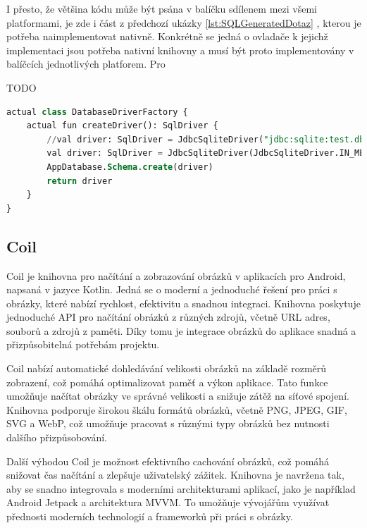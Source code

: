 I přesto, že většina kódu může být psána v balíčku sdílenem mezi všemi platformami, je zde i část z předchozí ukázky \ref{lst:SQLGeneratedDotaz}
, kterou je potřeba naimplementovat nativně. Konkrétně se jedná o ovladače k jejichž implementaci jsou potřeba nativní knihovny a musí
být proto implementovány v balíčcích jednotlivých platforem. Pro 

TODO
\begin{lstlisting}[caption={SQL vygenerovaný dotaz}, label={lst:SQLGeneratedDotaz}, language=SQL]
  actual class DatabaseDriverFactory {
    actual fun createDriver(): SqlDriver {
        //val driver: SqlDriver = JdbcSqliteDriver("jdbc:sqlite:test.db")
        val driver: SqlDriver = JdbcSqliteDriver(JdbcSqliteDriver.IN_MEMORY)
        AppDatabase.Schema.create(driver)
        return driver
    }
}
\end{lstlisting}




\subsection{Coil}
Coil je knihovna pro načítání a zobrazování obrázků v aplikacích pro Android, napsaná v jazyce Kotlin. Jedná se o moderní a jednoduché 
řešení pro práci s obrázky, které nabízí rychlost, efektivitu a snadnou integraci. Knihovna poskytuje jednoduché API pro načítání obrázků 
z různých zdrojů, včetně URL adres, souborů a zdrojů z paměti. Díky tomu je integrace obrázků do aplikace snadná a přizpůsobitelná potřebám projektu.

Coil nabízí automatické dohledávání velikosti obrázků na základě rozměrů zobrazení, což pomáhá optimalizovat paměť a výkon aplikace. Tato funkce 
umožňuje načítat obrázky ve správné velikosti a snižuje zátěž na síťové spojení. Knihovna podporuje širokou škálu formátů obrázků, včetně PNG, 
JPEG, GIF, SVG a WebP, což umožňuje pracovat s různými typy obrázků bez nutnosti dalšího přizpůsobování.

Další výhodou Coil je možnost efektivního cachování obrázků, což pomáhá snižovat čas načítání a zlepšuje uživatelský zážitek. Knihovna je navržena tak, 
aby se snadno integrovala s moderními architekturami aplikací, jako je například Android Jetpack a architektura MVVM. To umožňuje vývojářům využívat 
přednosti moderních technologií a frameworků při práci s obrázky.


